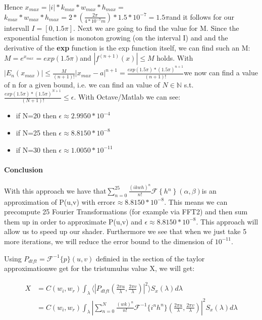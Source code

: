 Hence $x_{max}=|i|*k_{max}*w_{max}*h_{max}=$$k_{max}*w_{max}*h_{max}=2*(\frac{2\pi}{4*10^{-7}m})*1.5*10^{-7}=1.5\pi$and
it follows for our intervall $I=[0,1.5\pi]$. Next we are going to
find the value for M. Since the exponential function is monoton growing
(on the interval I) and and the derivative of the \textbf{exp} function
is the exp function itself, we can find such an M: $M=e^{x_{max}}=exp(1.5\pi)$and
$|f^{(n+1)}(x)|\leq M$ holds. With $|E_{n}(x_{max})|\leq\frac{M}{(n+1)!}|x_{max}-a|^{n+1}=\frac{exp(1.5\pi)*(1.5\pi)^{n+1}}{(n+1)!}$we
now can find a value of n for a given bound, i.e. we can find an value
of $N\mathbb{\in N}$ s.t. $\frac{exp(1.5\pi)*(1.5\pi)^{N+1}}{(N+1)!}\leq\epsilon$.
With Octave/Matlab we can see: 
\begin{itemize}
\item if N=20 then $\epsilon\approx2.9950*10^{-4}$
\item if N=25 then $\epsilon\approx8.8150*10^{-8}$
\item if N=30 then $\epsilon\approx1.0050*10^{-11}$
\end{itemize}

\paragraph {Conclusion}
With this approach we have that$\sum_{n=0}^{25}\frac{(ikwh)^{n}}{n!}\mathcal{F}\left\{ h{}^{n}\right\} (\alpha,\beta)$is
an approximation of P(u,v) with error$\epsilon\approx8.8150*10^{-8}$.
This means we can precompute 25 Fourier Transformations (for example
via FFT2) and then sum them up in order to approximate P(u,v) and
$\epsilon\approx8.8150*10^{-8}$. This approach will allow us to speed
up our shader. Furthermore we see that when we just take 5 more iterations,
we will reduce the error bound to the dimension of $10^{-11}$.



Using $P_{dtft} = \mathcal{F}^{-1}\{p\}(u,v)$ definied in the section of the taylor approximationwe get for the tristumulus value X, we will get:

\begin{align*}
X 
& = C(w_i,w_r) \int_{\lambda} \langle \left|P_{dtft}(\frac{2\pi u}{\lambda}, \frac{2\pi v}{\lambda})\right|^2\rangle S_x(\lambda)d\lambda \\
& = C(w_i,w_r) \int_{\lambda} \left| \sum_{n=0}^N \frac{(wk)^n}{n!} \mathcal{F}^{-1}\{i^n h^n\}(\frac{2\pi u}{\lambda}, \frac{2\pi v}{\lambda})\right|^2 S_x(\lambda)d\lambda
\end{align*}



